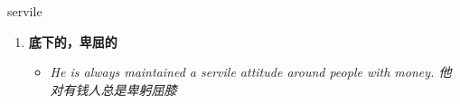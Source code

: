 
\begin{frame}
{\huge servile}
\begin{center}
\begin{enumerate}\Large
  \item \textbf{底下的，卑屈的}
  \begin{itemize}
    \item \em{\Large{He is always maintained a servile attitude around people with money. 他对有钱人总是卑躬屈膝}}
  \end{itemize}
\end{enumerate}
\end{center}
\end{frame}
